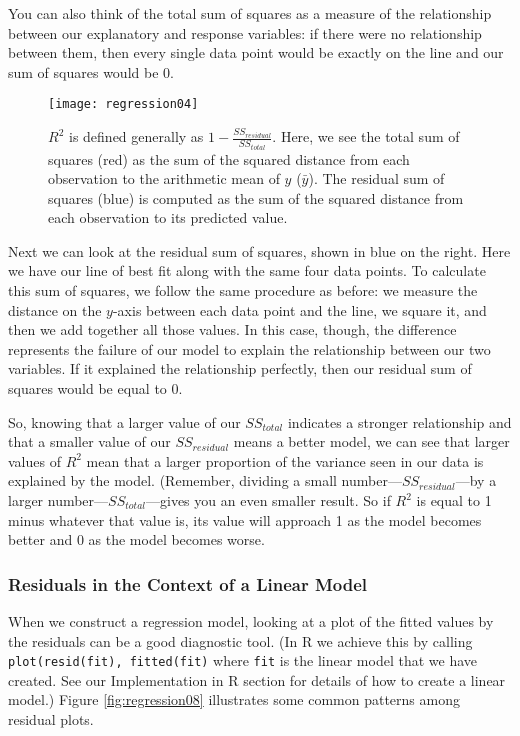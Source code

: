 You can also think of the total sum of squares as a measure of the relationship between our explanatory and response variables: if there were no relationship between them, then every single data point would be exactly on the line and our sum of squares would be $0$.

\begin{figure}[htp]
\texttt{[image: regression04]}
\caption{$R^2$ is defined generally as $1-\frac{SS_{residual}}{SS_{total}}$. Here, we see the total sum of squares (red) as the sum of the squared distance from each observation to the arithmetic mean of $y$ ($\bar{y}$). The residual sum of squares (blue) is computed as the sum of the squared distance from each observation to its predicted value.}
\label{fig:regression04}
\end{figure}

Next we can look at the residual sum of squares, shown in blue on the right. Here we have our line of best fit along with the same four data points. To calculate this sum of squares, we follow the same procedure as before: we measure the distance on the $y$-axis between each data point and the line, we square it, and then we add together all those values. In this case, though, the difference represents the failure of our model to explain the relationship between our two variables. If it explained the relationship perfectly, then our residual sum of squares would be equal to 0.

So, knowing that a larger value of our $SS_{total}$ indicates a stronger relationship and that a smaller value of our $SS_{residual}$ means a better model, we can see that larger values of $R^2$ mean that a larger proportion of the variance seen in our data is explained by the model. (Remember, dividing a small number---$SS_{residual}$---by a larger number---$SS_{total}$---gives you an even smaller result. So if $R^2$ is equal to 1 minus whatever that value is, its value will approach 1 as the model becomes better and 0 as the model becomes worse.

\subsubsection{Residuals in the Context of a Linear Model}

When we construct a regression model, looking at a plot of the fitted values by the residuals can be a good diagnostic tool. (In R we achieve this by calling \verb|plot(resid(fit), fitted(fit)| where \verb|fit| is the linear model that we have created. See our Implementation in R section for details of how to create a linear model.) Figure \ref{fig:regression08} illustrates some common patterns among residual plots.

